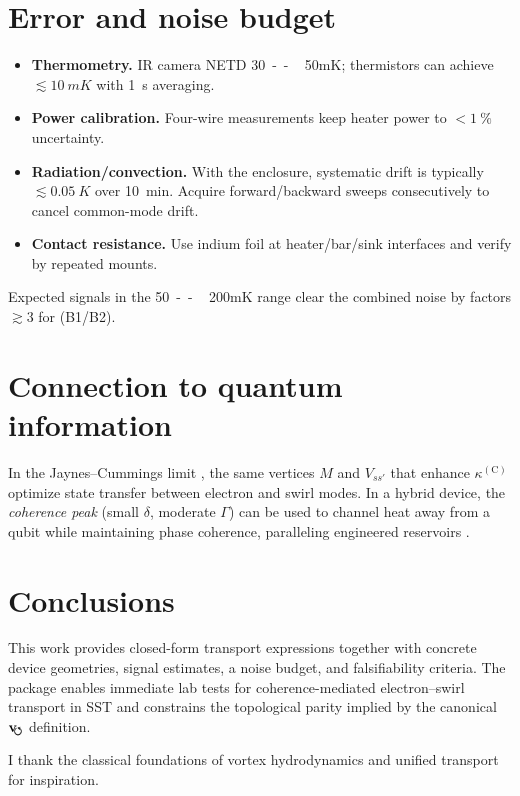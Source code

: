 \documentclass[aps,prb,preprint,amsmath,amssymb]{revtex4-2} %
\newcommand{\vswirl}{\mathbf{v}_{\!\mkern-2mu\scriptstyle\boldsymbol{\circlearrowleft}}}
\begin{document}
    \section{Error and noise budget}
        \begin{itemize}
            \item \textbf{Thermometry.} IR camera NETD \SI{30}{--\,50}{mK}; thermistors can achieve $\lesssim\SI{10}{mK}$ with \SI{1}{s} averaging.
            \item \textbf{Power calibration.} Four-wire measurements keep heater power to $<\!\SI{1}{\percent}$ uncertainty.
            \item \textbf{Radiation/convection.} With the enclosure, systematic drift is typically $\lesssim\SI{0.05}{K}$ over \SI{10}{min}. Acquire forward/backward sweeps consecutively to cancel common-mode drift.
            \item \textbf{Contact resistance.} Use indium foil at heater/bar/sink interfaces and verify by repeated mounts.
        \end{itemize}
        Expected signals in the \SI{50}{--\,200}{mK} range clear the combined noise by factors $\gtrsim3$ for (B1/B2).

    \section{Connection to quantum information}
        In the Jaynes--Cummings limit \cite{Jaynes1963}, the same vertices $M$ and $V_{ss'}$ that enhance $\kappa^{(\mathrm C)}$ optimize state transfer between electron and swirl modes. In a hybrid device, the \emph{coherence peak} (small $\delta$, moderate $\Gamma$) can be used to channel heat away from a qubit while maintaining phase coherence, paralleling engineered reservoirs \cite{Breuer2002,Aspelmeyer2014}.

    \section{Conclusions}
        This work provides closed-form transport expressions together with concrete device geometries, signal estimates, a noise budget, and falsifiability criteria. The package enables immediate lab tests for coherence-mediated electron--swirl transport in SST and constrains the topological parity implied by the canonical $\boldsymbol{\vswirl}$ definition.

        \begin{acknowledgments}
            I thank the classical foundations of vortex hydrodynamics and unified transport \cite{Madelung1927,Peierls1929,AllenFeldman1993,Simoncelli2022} for inspiration.
        \end{acknowledgments}
\end{document}
